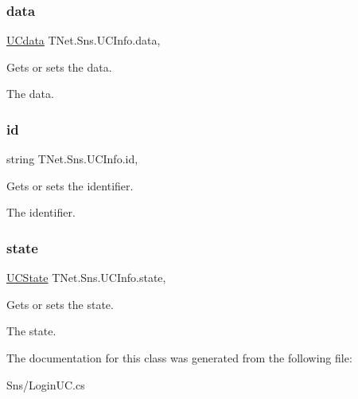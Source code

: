 \subsubsection{\texorpdfstring{data}{data}}
{\footnotesize\ttfamily \mbox{\hyperlink{class_t_net_1_1_sns_1_1_u_cdata}{U\+Cdata}} T\+Net.\+Sns.\+U\+C\+Info.\+data\hspace{0.3cm}{\ttfamily [get]}, {\ttfamily [set]}}



Gets or sets the data. 

The data.\mbox{\label{class_t_net_1_1_sns_1_1_u_c_info_a830b06eda6c267aacf0700dc9474a690}} 
\subsubsection{\texorpdfstring{id}{id}}
{\footnotesize\ttfamily string T\+Net.\+Sns.\+U\+C\+Info.\+id\hspace{0.3cm}{\ttfamily [get]}, {\ttfamily [set]}}



Gets or sets the identifier. 

The identifier.\mbox{\label{class_t_net_1_1_sns_1_1_u_c_info_a811c5e3ba364be5cee4498c1b291cc94}} 
\subsubsection{\texorpdfstring{state}{state}}
{\footnotesize\ttfamily \mbox{\hyperlink{class_t_net_1_1_sns_1_1_u_c_state}{U\+C\+State}} T\+Net.\+Sns.\+U\+C\+Info.\+state\hspace{0.3cm}{\ttfamily [get]}, {\ttfamily [set]}}



Gets or sets the state. 

The state.

The documentation for this class was generated from the following file\+:\begin{DoxyCompactItemize}
\item 
Sns/Login\+U\+C.\+cs\end{DoxyCompactItemize}
